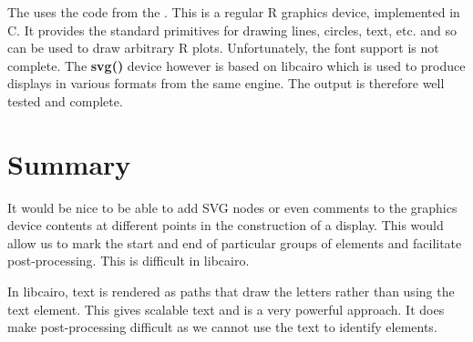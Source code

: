 \documentclass[article]{jss}
\def\Rfunc#1{\textbf{#1()}}
\begin{document}
The  uses the code from the .
This is a regular R graphics device, implemented in C.  It provides
the standard primitives for drawing lines, circles, text, etc. and so
can be used to draw arbitrary R plots.  Unfortunately, the font
support is not complete.  The \Rfunc{svg} device however is based on
libcairo which is used to produce displays in various formats from the
same engine. The output is therefore well tested and complete.



\section{Summary}


It would be nice to be able to add SVG nodes or even comments to the
graphics device contents at different points in the construction of a
display.  This would allow us to mark the start and end of particular
groups of elements and facilitate post-processing.  This is difficult
in libcairo.

In libcairo, text is rendered as paths that draw the letters rather
than using the text element. This gives scalable text and is a very 
powerful approach. It does make post-processing difficult as we cannot
use the text to identify elements.



\end{document}
